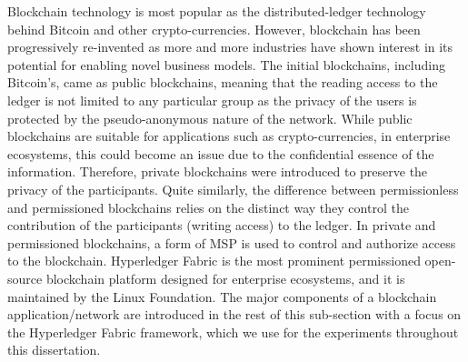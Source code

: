Blockchain technology is most popular as the distributed-ledger technology behind Bitcoin and other crypto-currencies. However, blockchain has been progressively re-invented as more and more industries have shown interest in its potential for enabling novel business models. The initial blockchains, including Bitcoin's, came as public blockchains, meaning that the reading access to the ledger is not limited to any particular group as the privacy of the users is protected by the pseudo-anonymous nature of the network. While public blockchains are suitable for applications such as crypto-currencies, in enterprise ecosystems, this could become an issue due to the confidential essence of the information. Therefore, private blockchains were introduced to preserve the privacy of the participants. Quite similarly, the difference between permissionless and permissioned blockchains relies on the distinct way they control the contribution of the participants (writing access) to the ledger. In private and permissioned blockchains, a form of \ac{MSP} is used to control and authorize access to the blockchain. Hyperledger Fabric \cite{fabric} is the most prominent permissioned open-source blockchain platform designed for enterprise ecosystems, and it is maintained by the Linux Foundation.
The major components of a blockchain application/network are introduced in the rest of this sub-section with a focus on the Hyperledger Fabric framework, which we use for the experiments throughout this dissertation. 





